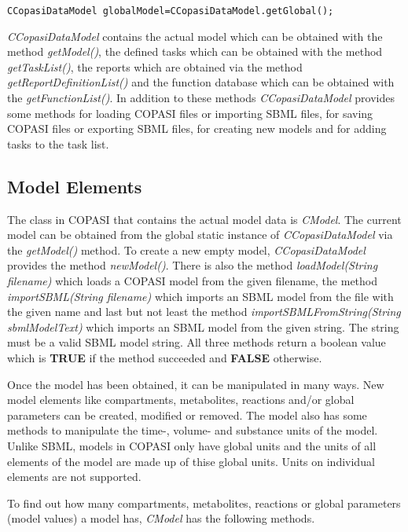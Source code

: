 \documentclass[a4,12pt]{article}
\begin{document}
\begin{lstlisting}
CCopasiDataModel globalModel=CCopasiDataModel.getGlobal();
\end{lstlisting}

\textit{CCopasiDataModel} contains the actual model which can be obtained with the method \textit{getModel()}, the defined tasks which can be obtained with the method \textit{getTaskList()}, the reports which are obtained via the method \textit{getReportDefinitionList()} and the function database which can be obtained with the \textit{getFunctionList()}.
In addition to these methods \textit{CCopasiDataModel} provides some methods for loading COPASI files or importing SBML files, for saving COPASI files or exporting SBML files, for creating new models and for adding tasks to the task list.

\subsection{Model Elements}
The class in COPASI that contains the actual model data is \textit{CModel}. The current model can be obtained from the global static instance of \textit{CCopasiDataModel} via the \textit{getModel()} method. To create a new empty model, \textit{CCopasiDataModel} provides the method \textit{newModel()}. There is also the method \textit{loadModel(String filename)} which loads a COPASI model from the given filename, the method \textit{importSBML(String filename)} which imports an SBML model from the file with the given name and last but not least the method \textit{importSBMLFromString(String sbmlModelText)} which imports an SBML model from the given string. The string must be a valid SBML model string. All three methods return a boolean value which is \textbf{TRUE} if the method succeeded and \textbf{FALSE} otherwise.

Once the model has been obtained, it can be manipulated in many ways. New model elements like compartments, metabolites, reactions and/or global parameters can be created, modified or removed. The model also has some methods to manipulate the time-, volume- and substance units of the model. Unlike SBML, models in COPASI only have global units and the units of all elements of the model are made up of thise global units. Units on individual elements are not supported.

To find out how many compartments, metabolites, reactions or global parameters (model values) a model has, \textit{CModel} has the following methods.
\end{document}
